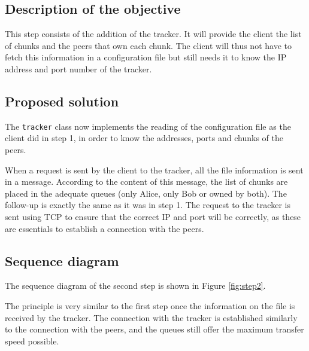 \subsection{Description of the objective}

This step consists of the addition of the tracker. It will provide the client the list of chunks and the peers that own each chunk. The client will thus not have to fetch this information in a configuration file but still needs it to know the IP address and port number of the tracker.

\subsection{Proposed solution}

The \texttt{tracker} class now implements the reading of the configuration file as the client did in step 1, in order to know the addresses, ports and chunks of the peers.

When a request is sent by the client to the tracker, all the file information is sent in a message. According to the content of this message, the list of chunks are placed in the adequate queues (only Alice, only Bob or owned by both). The follow-up is exactly the same as it was in step 1. The request to the tracker is sent using TCP to ensure that the correct IP and port will be correctly, as these are essentials to establish a connection with the peers.

\subsection{Sequence diagram}

The sequence diagram of the second step is shown in Figure \ref{fig:step2}.

The principle is very similar to the first step once the information on the file is received by the tracker. The connection with the tracker is established similarly to the connection with the peers, and the queues still offer the maximum transfer speed possible.

